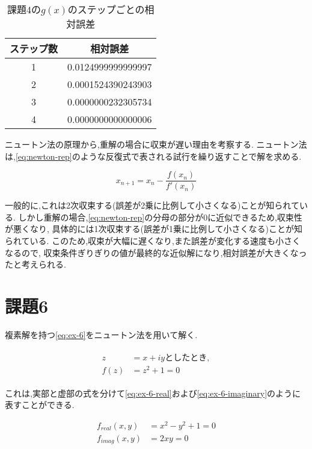 \documentclass[autodetect-engine, dvi=dvipdfmx, 10pt, a4paper, ja=standard]{bxjsarticle}
\begin{document}
\begin{table}[htbp]
	\centering
	\caption{課題4の$g(x)$のステップごとの相対誤差}
	\label{table:ex-5-g}
	\begin{tabular}{@{}cc@{}}
		\toprule
		ステップ数 & 相対誤差               \\ \midrule
		1     & 0.0124999999999997 \\
		2     & 0.0001524390243903 \\
		3     & 0.0000000232305734 \\
		4     & 0.0000000000000006 \\ \bottomrule
	\end{tabular}
\end{table}

ニュートン法の原理から,重解の場合に収束が遅い理由を考察する.
ニュートン法は,\ref{eq:newton-rep}のような反復式で表される試行を繰り返すことで解を求める.

\begin{equation}
	\label{eq:newton-rep}
	x_{n+1} = x_n - \frac{f(x_n)}{f'(x_n)}
\end{equation}

一般的に,これは2次収束する(誤差が2乗に比例して小さくなる)ことが知られている.
しかし重解の場合,\ref{eq:newton-rep}の分母の部分が$0$に近似できるため,収束性が悪くなり,
具体的には1次収束する(誤差が1乗に比例して小さくなる)ことが知られている.
このため,収束が大幅に遅くなり,また誤差が変化する速度も小さくなるので,
収束条件ぎりぎりの値が最終的な近似解になり,相対誤差が大きくなったと考えられる.

\newpage

\section{課題6}
\label{sec:ex-6}

複素解を持つ\ref{eq:ex-6}をニュートン法を用いて解く.

\begin{align}
	\begin{split}
		\label{eq:ex-6}
		z    & = x + iyとしたとき, \\
		f(z) & = z^2 + 1 = 0
	\end{split}
\end{align}

これは,実部と虚部の式を分けて\ref{eq:ex-6-real}および\ref{eq:ex-6-imaginary}のように表すことができる.

\begin{align}
	f_{real}(x, y) & = x^2 - y^2 + 1 = 0 \label{eq:ex-6-real} \\
	f_{imag}(x, y) & = 2xy = 0 \label{eq:ex-6-imaginary}
\end{align}
\end{document}
